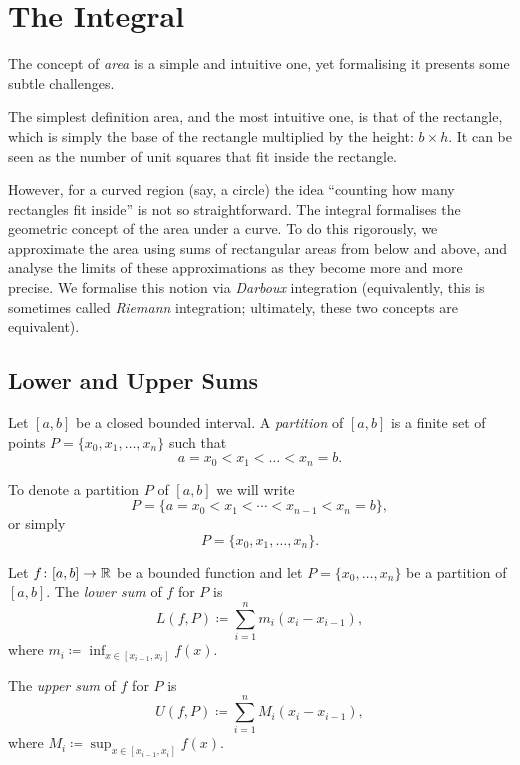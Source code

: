 \documentclass[../analysis1.tex]{subfiles}
\begin{document}
\chapter{The Integral}

The concept of \textit{area} is a simple and intuitive one, yet formalising it presents some subtle challenges.

The simplest definition area, and the most intuitive one, is that of the rectangle, which is simply the base of the rectangle multiplied by the height: $b\times h$. It can be seen as the number of unit squares that fit inside the rectangle.

However, for a curved region (say, a circle) the idea ``counting how many rectangles fit inside'' is not so straightforward. The integral formalises the geometric concept of the area under a curve. To do this rigorously, we approximate the area using sums of rectangular areas from below and above, and analyse the limits of these approximations as they become more and more precise. We formalise this notion via \textit{Darboux} integration (equivalently, this is sometimes called \textit{Riemann} integration; ultimately, these two concepts are equivalent).


\section{Lower and Upper Sums}

\begin{definition}[Partition]
    \begin{shaded*}
        Let $[a,b]$ be a closed bounded interval. A \textit{partition} of $[a,b]$ is a finite set of points $P = \{x_0, x_1, \dots, x_n\}$ such that
        \[
            a = x_0 < x_1 < \dots < x_n = b.
        \]
    \end{shaded*}
\end{definition}
To denote a partition $P$ of $[a,b]$ we will write \[P=\{a=x_0<x_1<\cdots<x_{n-1}<x_n=b\},\]
or simply \[P=\{x_0,x_1,\dots,x_n\}.\]

\begin{definition}
    \begin{shaded*}
        Let $f \colon [a,b] \to \mathbb{R}$ be a bounded function and let $P=\{x_0,\dots,x_n\}$ be a partition of $[a,b]$. The \textit{lower sum} of $f$ for $P$ is
        \[
            L(f,P) \coloneqq \sum_{i=1}^n m_i (x_i - x_{i-1}),
        \]
        where $m_i \coloneqq \inf_{x \in [x_{i-1}, x_i]} f(x)$. 
        
        The \textit{upper sum} of $f$ for $P$ is
        \[
            U(f,P) \coloneqq \sum_{i=1}^n M_i (x_i - x_{i-1}),
        \]
        where $M_i \coloneqq \sup_{x \in [x_{i-1}, x_i]} f(x)$.
    \end{shaded*}
\end{definition}
\end{document}

